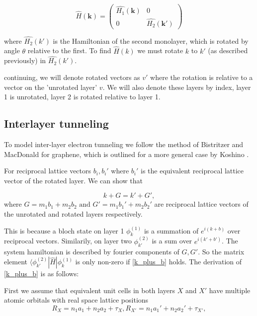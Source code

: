 \documentclass[10pt, twocolumn]{article} %
\begin{document}
      \begin{equation}
        \hat{H}(\boldsymbol{k})=\left(\begin{array}{cc}
          \hat{H_1}(\boldsymbol{k}) & 0\\
          0 & \hat{H_2}(\boldsymbol{k'})
        \end{array}\right)
      \end{equation}
      
  where $\hat{H_2}(k')$ is the Hamiltonian of the second monolayer, which is rotated by angle $\theta$ relative to the first. To find $\hat{H}(k)$ we must rotate $k$ to $k'$ (as described previously) in $\hat{H_2}(k')$.

  continuing, we will denote rotated vectors as $v'$ where the rotation is relative to a vector on the 'unrotated layer' $v$. We will also denote these layers by index, layer 1 is unrotated, layer 2 is rotated relative to layer 1.

\subsection*{Interlayer tunneling}
  To model inter-layer electron tunneling we follow the method of Bistritzer and MacDonald \cite{Bistritzer_2011} for graphene, which is outlined for a more general case by Koshino \cite{Koshino_2015}.

  For reciprocal lattice vectors $b_i, b_i'$ where $b_i'$ is the equivalent reciprocal lattice vector of the rotated layer. We can show that

  \begin{equation}
    k + G = k' + G',
    \label{inter-layer_k_plus_G}
  \end{equation}
  where $G = m_1 b_1 + m_2 b_2 \text{ and } G' = m_1 b_1' + m_2 b_2'$ are reciprocal lattice vectors of the unrotated and rotated layers respectively.

  This is because a bloch state on layer 1 $\phi_k^{(1)}$ is a summation of $e^{i(k+b)}$ over reciprocal vectors. Similarily, on layer two $\phi_{k'}^{(2)}$ is a sum over $e^{i(k'+b')}$. The system hamiltonian is described by fourier components of $G, G'$. So the matrix element $\langle \phi_{k'}^{(2)} | \hat{H} | \phi_{k}^{(1)}$ is only non-zero if \ref{k_plus_b} holds. The derivation of \ref{k_plus_b} is as follows:

  First we assume that equivalent unit cells in both layers $X$ and $X'$ have multiple atomic orbitals with real space lattice positions
  \begin{equation}
    R_X = n_1 a_1 + n_2 a_2 + \tau_X,
    R_{X'} = n_1 a_1' + n_2 a_2' + \tau_{X'},
    \label{inter-layer_real_sublattice_positions}
  \end{equation}
\end{document}
